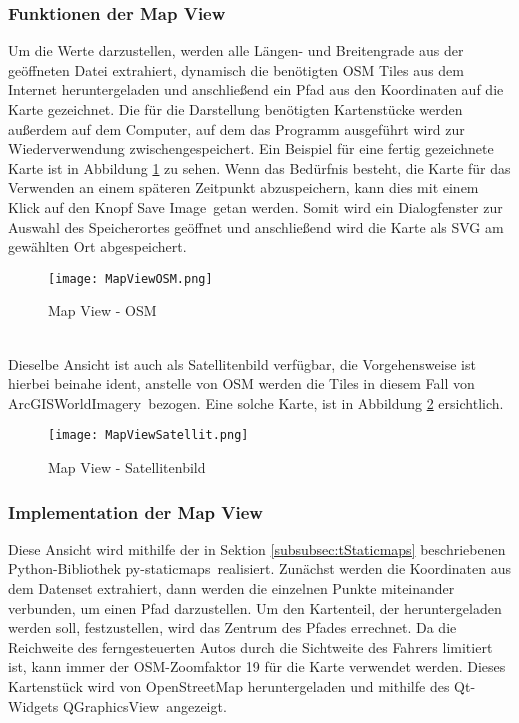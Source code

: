 \subsubsection{Funktionen der Map View}
\label{subsubsec:MapViewFunktion}
Um die Werte darzustellen, werden alle Längen- und Breitengrade aus der geöffneten Datei extrahiert, dynamisch die benötigten \ac{OSM} Tiles aus dem Internet heruntergeladen und anschließend ein Pfad aus den Koordinaten auf die Karte gezeichnet. Die für die Darstellung benötigten Kartenstücke werden außerdem auf dem Computer, auf dem das Programm ausgeführt wird zur Wiederverwendung zwischengespeichert. Ein Beispiel für eine fertig gezeichnete Karte ist in Abbildung 
\ref{fig:OSMMapView} zu sehen. Wenn das Bedürfnis besteht, die Karte für das Verwenden an einem späteren Zeitpunkt abzuspeichern, kann dies mit einem Klick auf den Knopf \glqq Save Image\grqq\ getan werden. Somit wird ein Dialogfenster zur Auswahl des Speicherortes geöffnet und anschließend wird die Karte als \ac{SVG} am gewählten Ort abgespeichert.
\begin{figure}[h]
\centering
\texttt{[image: MapViewOSM.png]}
\caption{Map View - \ac{OSM}}
\label{fig:OSMMapView}
\end{figure}
\\
Dieselbe Ansicht ist auch als Satellitenbild verfügbar, die Vorgehensweise ist hierbei beinahe ident, anstelle von \ac{OSM} werden die Tiles in diesem Fall von \glqq ArcGISWorldImagery\grqq\ bezogen. Eine solche Karte, ist in Abbildung \ref{fig:SatteliteMapView} ersichtlich. 
\begin{figure}[h]
\centering
\texttt{[image: MapViewSatellit.png]}
\caption{Map View - Satellitenbild}
\label{fig:SatteliteMapView}
\end{figure}

\subsubsection{Implementation der Map View}
\label{subsubsec:MapViewImplementation}
Diese Ansicht wird mithilfe der in Sektion \ref{subsubsec:tStaticmaps} beschriebenen Python-Bibliothek \glqq py-staticmaps\grqq \ realisiert. Zunächst werden die Koordinaten aus dem Datenset extrahiert, dann werden die einzelnen Punkte miteinander verbunden, um einen Pfad darzustellen. Um den Kartenteil, der heruntergeladen werden soll, festzustellen, wird das Zentrum des Pfades errechnet. Da die Reichweite des ferngesteuerten Autos durch die Sichtweite des Fahrers limitiert ist, kann immer der \ac{OSM}-Zoomfaktor 19 für die Karte verwendet werden. Dieses Kartenstück wird von OpenStreetMap heruntergeladen und mithilfe des Qt-Widgets \glqq QGraphicsView\grqq\ angezeigt.